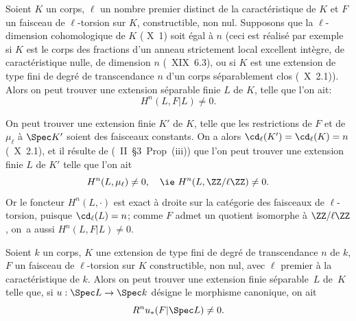 \begin{lemme} \label{XIV.3.2} Soient $K$ un corps, $\ell$ un nombre premier distinct de la caract\'eristique de $K$ et $F$ un faisceau de $\ell$-torsion sur $K$, constructible, non nul. Supposons que la $\ell$-dimension cohomologique de $K$ (\textup{ X~1}) soit \'egal \`a $n$ (ceci est r\'ealis\'e par exemple si $K$ est le corps des fractions d'un anneau strictement local excellent int\`egre, de caract\'eristique nulle, de dimension $n$ (\textup{~XIX~6.3}), ou si $K$ est une extension de type fini de degr\'e de transcendance $n$ d'un corps s\'eparablement clos (\textup{~X~2.1})). Alors on peut trouver une extension s\'eparable finie $L$ de $K$, telle que l'on ait:
$$H^n(L, F{|L}) \neq 0.
$$
\end{lemme}

On peut trouver une extension finie $K'$ de $K$, telle que les restrictions de $F$ et de $\mu_\ell$ \`a $\Spec K'$ soient des faisceaux constants. On a alors $\cd_{\ell}(K') = \cd_{\ell}(K) = n$ (~X~2.1), et il r\'esulte de (\cite{XIV.2}~II~\S 3~Prop~\textup{(iii)}) que l'on peut trouver une extension finie $L$ de $K'$ telle que l'on ait\pageoriginale
$$
H^n(L, \mu_{\ell})\neq 0, \quad\text {\ie } H^n(L, \ZZ/\ell\ZZ) \neq 0.
$$
Or le foncteur $H^n(L,\cdot)$ est exact \`a droite sur la cat\'egorie des faisceaux de $\ell$-torsion, puisque $\cd_{\ell}(L)=n$; comme $F$ admet un quotient isomorphe \`a $\ZZ/\ell\ZZ$, on~a aussi $H^n(L, F{|L}) \neq 0$.

\begin{corollaire} \label{XIV.3.3}
Soient $k$ un corps, $K$ une extension de type fini de degr\'e de transcendance $n$ de $k$, $F$ un faisceau de $\ell$-torsion sur $K$ constructible, non nul, avec $\ell$ premier \`a la caract\'eristique de $k$. Alors on peut trouver une extension finie s\'eparable~$L$ de~$K$ telle que, si $u: \Spec L \to \Spec k$ d\'esigne le morphisme canonique, on ait
$$R^n u_*(F{|\Spec L}) \neq 0.
$$
\end{corollaire}

